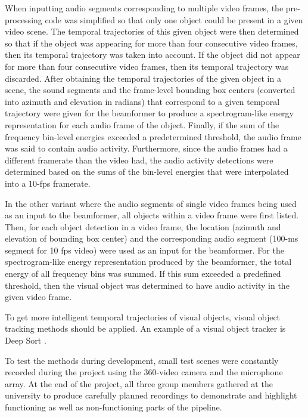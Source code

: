 When inputting audio segments corresponding to multiple video frames, the pre-processing code was simplified so that only one object could be present in a given video scene. The temporal trajectories of this given object were then determined so that if the object was appearing for more than four consecutive video frames, then its temporal trajectory was taken into account. If the object did not appear for more than four consecutive video frames, then its temporal trajectory was discarded. After obtaining the temporal trajectories of the given object in a scene, the sound segments and the frame-level bounding box centers (converted into azimuth and elevation in radians) that correspond to a given temporal trajectory were given for the beamformer to produce a spectrogram-like energy representation for each audio frame of the object. Finally, if the sum of the frequency bin-level energies exceeded a predetermined threshold, the audio frame was said to contain audio activity. Furthermore, since the audio frames had a different framerate than the video had, the audio activity detections were determined based on the sums of the bin-level energies that were interpolated into a 10-fps framerate.

In the other variant where the audio segments of single video frames being used as an input to the beamformer, all objects within a video frame were first listed. Then, for each object detection in a video frame, the location (azimuth and elevation of bounding box center) and the corresponding audio segment (100-ms segment for 10 fps video) were used as an input for the beamformer. For the spectrogram-like energy representation produced by the beamformer, the total energy of all frequency bins was summed. If this sum exceeded a predefined threshold, then the visual object was determined to have audio activity in the given video frame.

To get more intelligent temporal trajectories of visual objects, visual object tracking methods should be applied. An example of a visual object tracker is Deep Sort .


To test the methods during development, small test scenes were constantly recorded during the project using the 360-video camera and the microphone array. At the end of the project, all three group members gathered at the university to produce carefully planned recordings to demonstrate and highlight functioning as well as non-functioning parts of the pipeline.



